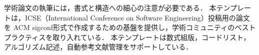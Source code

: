 
学術論文の執筆には，書式と構造への細心の注意が必要である．
本テンプレートは，ICSE（International Conference on Software Engineering）投稿用の論文を
ACM sigconf形式で作成するための基盤を提供し，学術コミュニティのベストプラクティスを取り入れている．
本テンプレートは数式組版，コードリスト，アルゴリズム記述，自動参考文献管理をサポートしている．
